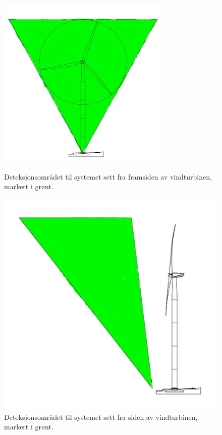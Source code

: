 \begin{figure}[!htbp]%
  \centering
  \begin{minipage}[b]{0.45\textwidth}
    \includegraphics[width=\textwidth]{design/DeteksjonForan.jpg}
    \caption{Deteksjonsområdet til systemet sett fra framsiden av vindturbinen, markert i grønt. }
    \label{fig:TurbinForan}
  \end{minipage}
  \hfill
  \begin{minipage}[b]{0.45\textwidth}
    \includegraphics[width=\textwidth]{design/DeteksjonSiden2.jpg}
    \caption{Deteksjonsområdet til systemet sett fra siden av vindturbinen, markert i grønt.}
    \label{fig:TurbinSiden}
  \end{minipage}
\end{figure}

